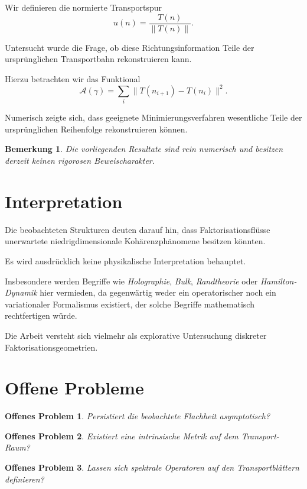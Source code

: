 \documentclass[11pt,a4paper]{article}
\newtheorem{bemerkung}{Bemerkung}
\newtheorem{problem}{Offenes Problem}
\begin{document}
	Wir definieren die normierte Transportspur
	\[
	u(n)=\frac{T(n)}{\|T(n)\|}.
	\]
	
	Untersucht wurde die Frage, ob diese Richtungsinformation Teile der ursprünglichen Transportbahn rekonstruieren kann.
	
	Hierzu betrachten wir das Funktional
	\[
	\mathcal A(\gamma)
	=
	\sum_i
	\|T(n_{i+1})-T(n_i)\|^2.
	\]
	
	Numerisch zeigte sich, dass geeignete Minimierungsverfahren wesentliche Teile der ursprünglichen Reihenfolge rekonstruieren können.
	
	\begin{bemerkung}
		Die vorliegenden Resultate sind rein numerisch und besitzen derzeit keinen rigorosen Beweischarakter.
	\end{bemerkung}
	
	\section{Interpretation}
	
	Die beobachteten Strukturen deuten darauf hin, dass Faktorisationsflüsse unerwartete niedrigdimensionale Kohärenzphänomene besitzen könnten.
	
	Es wird ausdrücklich keine physikalische Interpretation behauptet.
	
	Insbesondere werden Begriffe wie
	\emph{Holographie},
	\emph{Bulk},
	\emph{Randtheorie}
	oder
	\emph{Hamilton-Dynamik}
	hier vermieden, da gegenwärtig weder ein operatorischer noch ein variationaler Formalismus existiert, der solche Begriffe mathematisch rechtfertigen würde.
	
	Die Arbeit versteht sich vielmehr als explorative Untersuchung diskreter Faktorisationsgeometrien.
	
	\section{Offene Probleme}
	
	\begin{problem}
		Persistiert die beobachtete Flachheit asymptotisch?
	\end{problem}
	
	\begin{problem}
		Existiert eine intrinsische Metrik auf dem Transport-Raum?
	\end{problem}
	
	\begin{problem}
		Lassen sich spektrale Operatoren auf den Transportblättern definieren?
	\end{problem}
	
\end{document}
